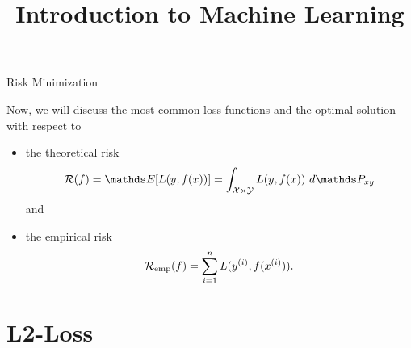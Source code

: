 




\newcommand{\titlefigure}{figure_man/optimization_steps.jpeg}
\newcommand{\learninggoals}{
\item Understand that an ML model is simply a parametrized curve
\item Understand that the hypothesis space lists all admissible models
    for a learner
\item Understand the relationship between the hypothesis space and the parameter space
}

\title{Introduction to Machine Learning}
\date{}




\begin{vbframe}{Risk Minimization}

Now, we will discuss the most common loss functions and the optimal solution with respect to 


\begin{itemize}
  \item the theoretical risk 
  $$
  \riskf =  \E[\Lxy] = \int_{\Xspace \times \Yspace} \Lxy ~ d\Pxy
  $$ 
  and
  \item the empirical risk 
  $$
 \mathcal{R}_{\text{emp}}(f) = \sum_{i=1}^n L(y^{(i)}, f(x^{(i)})). 
  $$
\end{itemize}

\end{vbframe}

\section{L2-Loss}


